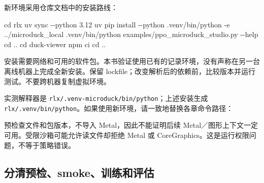 \documentclass[
  chinese,
  11pt,
  letterpaper,
]{article}
\newenvironment{Shaded}{\begin{snugshade}}{\end{snugshade}}
\newcommand{\AttributeTok}[1]{\textcolor[rgb]{0.13,0.29,0.53}{#1}}
\newcommand{\BuiltInTok}[1]{#1}
\newcommand{\ExtensionTok}[1]{#1}
\newcommand{\NormalTok}[1]{#1}
\newcommand{\OperatorTok}[1]{\textcolor[rgb]{0.81,0.36,0.00}{\textbf{#1}}}
\newcommand{\StringTok}[1]{\textcolor[rgb]{0.31,0.60,0.02}{#1}}
\newcommand{\VariableTok}[1]{\textcolor[rgb]{0.00,0.00,0.00}{#1}}
\renewenvironment{Shaded}{\par\smallskip}{\par\smallskip}
\begin{document}
新环境采用仓库文档中的安装路线：

\begin{Shaded}
\begin{Highlighting}[]
\BuiltInTok{cd}\NormalTok{ rlx}
\ExtensionTok{uv}\NormalTok{ sync }\AttributeTok{{-}{-}python}\NormalTok{ 3.12}
\ExtensionTok{uv}\NormalTok{ pip install }\AttributeTok{{-}{-}python}\NormalTok{ .venv/bin/python }\AttributeTok{{-}e}\NormalTok{ ../microduck\_local}
\ExtensionTok{.venv/bin/python}\NormalTok{ examples/ppo\_microduck\_studio.py }\AttributeTok{{-}{-}help}
\BuiltInTok{cd}\NormalTok{ ..}
\BuiltInTok{cd}\NormalTok{ duck{-}viewer}
\ExtensionTok{npm}\NormalTok{ ci}
\BuiltInTok{cd}\NormalTok{ ..}
\end{Highlighting}
\end{Shaded}

安装需要网络和可用的软件包。本书验证使用已有的记录环境，没有声称在另一台离线机器上完成全新安装。保留
lockfile；改变解析后的依赖前，比较版本并运行测试。不要跨机器复制虚拟环境。

实测解释器是
\texttt{rlx/\allowbreak{}.venv-\allowbreak{}microduc\allowbreak{}k/\allowbreak{}bin/\allowbreak{}python}；上述安装生成
\texttt{rlx/\allowbreak{}.venv/\allowbreak{}bin/\allowbreak{}python}。如果使用新环境，请一致地替换各章命令路径：

\begin{Shaded}
\end{Shaded}

预检查文件和包版本，不导入 Metal，因此不能证明后续
Metal／图形上下文一定可用。受限沙箱可能允许读文件却拒绝 Metal 或
CoreGraphics。这是运行权限问题，不等于策略错误。

\subsection{分清预检、smoke、训练和评估}\label{ux5206ux6e05ux9884ux68c0smokeux8badux7ec3ux548cux8bc4ux4f30}
\end{document}
